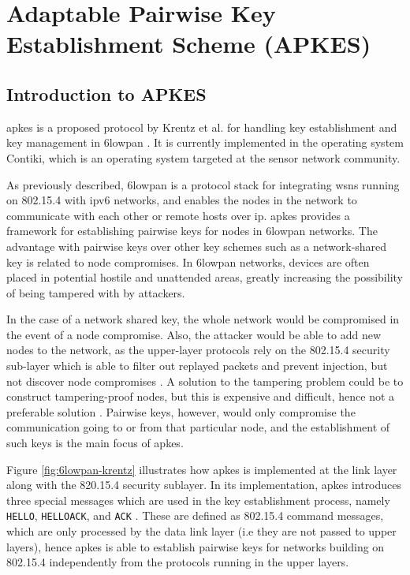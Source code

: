 \chapter{Adaptable Pairwise Key Establishment Scheme (APKES)}
\label{chp:krentz-6lowpan}


\section{Introduction to APKES}
\gls{apkes} is a proposed protocol by Krentz et al. for handling key establishment and key management in \gls{6lowpan} \cite{krentz20136lowpan}. It is currently implemented in the operating system Contiki, which is an operating system targeted at the sensor network community.


As previously described, \gls{6lowpan} is a protocol stack for integrating \gls{wsn}s running on 802.15.4 with \gls{ip}v6 networks, and enables the nodes in the network to communicate with each other or remote hosts over \gls{ip}. \gls{apkes} provides a framework for establishing pairwise keys for nodes in \gls{6lowpan} networks. The advantage with pairwise keys over other key schemes such as a network-shared key is related to node compromises. In \gls{6lowpan} networks, devices are often placed in potential hostile and unattended areas, greatly increasing the possibility of being tampered with by attackers.

In the case of a network shared key, the whole network would be compromised in the event of a node compromise. Also, the attacker would be able to add new nodes to the network, as the upper-layer protocols rely on the 802.15.4 security sub-layer which is able to filter out replayed packets and prevent injection, but not discover node compromises \cite{krentz20136lowpan}. A solution to the tampering problem could be to construct tampering-proof nodes, but this is expensive and difficult, hence not a preferable solution \cite{anderson1996tamper}. Pairwise keys, however, would only compromise the communication going to or from that particular node, and the establishment of such keys is the main focus of \gls{apkes}.

Figure \ref{fig:6lowpan-krentz} illustrates how \gls{apkes} is implemented at the link layer along with the 820.15.4 security sublayer. In its implementation, \gls{apkes} introduces three special messages which are used in the key establishment process, namely \texttt{HELLO}, \texttt{HELLOACK}, and \texttt{ACK} \cite{krentz20136lowpan}. These are defined as 802.15.4 command messages, which are only processed by the data link layer (i.e they are not passed to upper layers), hence \gls{apkes} is able to establish pairwise keys for networks building on 802.15.4 independently from the protocols running in the upper layers.

